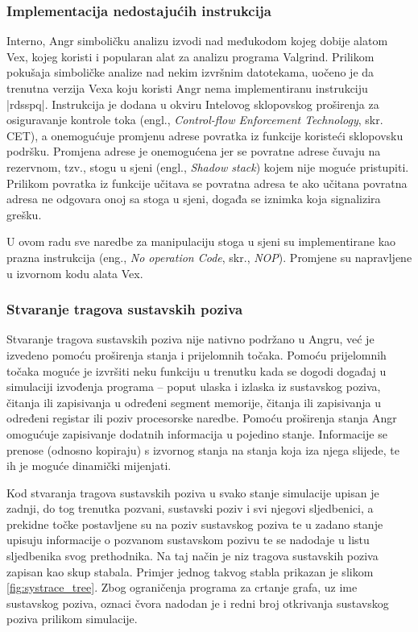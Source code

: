 \subsubsection{Implementacija nedostajućih instrukcija}
Interno, Angr simboličku analizu izvodi nad međukodom kojeg dobije alatom Vex,
kojeg koristi i popularan alat za analizu programa Valgrind. Prilikom pokušaja
simboličke analize nad nekim izvršnim datotekama, uočeno je da trenutna verzija
Vexa koju koristi Angr nema implementiranu instrukciju \inlinecode|rdsspq|.
Instrukcija je dodana u okviru Intelovog sklopovskog proširenja za osiguravanje
kontrole toka (engl., \textit{Control-flow Enforcement Technology}, skr. CET), 
a onemogućuje promjenu adrese povratka iz funkcije koristeći sklopovsku 
podršku. Promjena adrese je onemogućena jer se povratne adrese čuvaju na
rezervnom, tzv., stogu u sjeni (engl., \textit{Shadow stack}) kojem nije moguće 
pristupiti. Prilikom povratka iz funkcije učitava se povratna adresa te ako
učitana povratna adresa ne odgovara onoj sa stoga u sjeni, događa se iznimka koja
signalizira grešku. 

U ovom radu sve naredbe za manipulaciju stoga u sjeni su implementirane kao
prazna instrukcija (eng., \textit{No operation Code}, skr., \textit{NOP}). 
Promjene su napravljene u izvornom kodu alata Vex.


\subsubsection{Stvaranje tragova sustavskih poziva}
Stvaranje tragova sustavskih poziva nije nativno podržano u Angru, već je
izvedeno pomoću proširenja stanja i prijelomnih točaka. Pomoću prijelomnih
točaka moguće je izvršiti neku funkciju u trenutku kada se dogodi događaj u
simulaciji izvođenja programa -- poput ulaska i izlaska iz sustavskog poziva,
čitanja ili zapisivanja u određeni segment memorije, čitanja ili zapisivanja u
određeni registar ili poziv procesorske naredbe. Pomoću proširenja stanja Angr
omogućuje zapisivanje dodatnih informacija u pojedino stanje. Informacije se
prenose (odnosno kopiraju) s izvornog stanja na stanja koja iza njega slijede,
te ih je moguće dinamički mijenjati.

Kod stvaranja tragova sustavskih poziva u svako stanje simulacije upisan je 
zadnji, do tog trenutka pozvani, sustavski poziv i svi njegovi sljedbenici, a 
prekidne točke postavljene su na poziv sustavskog poziva te u zadano 
stanje upisuju informacije o pozvanom sustavskom pozivu te se nadodaje u listu
sljedbenika svog prethodnika. Na taj način je niz tragova sustavskih
poziva zapisan kao skup stabala. Primjer jednog takvog stabla prikazan je slikom
\ref{fig:systrace_tree}. Zbog ograničenja programa za crtanje grafa, uz ime
sustavskog poziva, oznaci čvora nadodan je i redni broj otkrivanja sustavskog
poziva prilikom simulacije.


